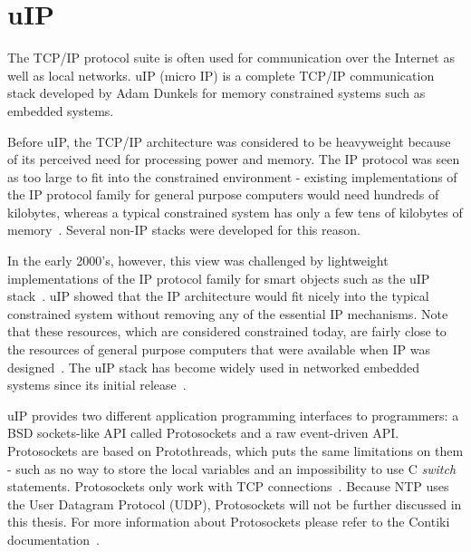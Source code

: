 
\section{uIP}\label{sec:contiki-uip}
The TCP/IP protocol suite is often used for communication over the Internet as well as local networks.
uIP (micro IP) is a complete TCP/IP communication stack developed by Adam Dunkels
for memory constrained systems such as embedded systems.

Before uIP, the TCP/IP architecture was considered to be heavyweight
because of its perceived need for processing power and memory.
The IP protocol was seen as too large to fit into the constrained environment -
existing implementations of the IP protocol family for general purpose computers would need hundreds
of kilobytes, whereas a typical constrained system has only a few tens of kilobytes of memory~\cite{interconnecting}.
Several non-IP stacks were developed for this reason.

In the early 2000's, however, this view was challenged by lightweight implementations of the IP
protocol family for smart objects such as the uIP stack~\cite{interconnecting}.
uIP showed that the IP architecture would fit nicely into the typical constrained system
without removing any of the essential IP mechanisms.
Note that these resources, which are considered constrained today, are fairly close to the
resources of general purpose computers that were available when IP was designed~\cite{interconnecting}.
The uIP stack has become widely used in networked embedded systems
since its initial release~\cite{interconnecting, thesis-programming}.

uIP provides two different application programming interfaces to programmers:
a BSD sockets-like API called Protosockets and a raw event-driven API.
Protosockets are based on Protothreads, which puts the same limitations on them - such as
no way to store the local variables and an impossibility to use C {\it switch} statements.
Protosockets only work with TCP connections~\cite{contiki-docs}.
Because NTP uses the User Datagram Protocol (UDP), Protosockets will not be further
discussed in this thesis. For more information about Protosockets
please refer to the Contiki documentation~\cite{contiki-docs}.

